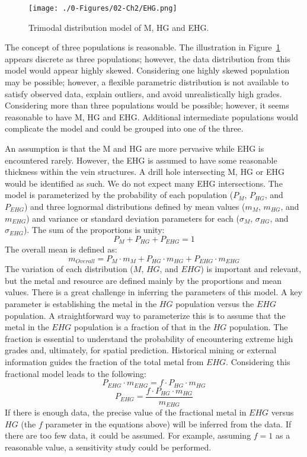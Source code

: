 \begin{figure}[htb!]
    \centering
    \texttt{[image: ./0-Figures/02-Ch2/EHG.png]}
    \caption{Trimodal distribution model of \acrfull{M}, \acrfull{HG} and \acrfull{EHG}.}
    \label{fig:ehg}
\end{figure}


The concept of three populations is reasonable. The illustration in Figure~\ref{fig:ehg} appears discrete as three populations; however, the data distribution from this model would appear highly skewed. Considering one highly skewed population may be possible; however, a flexible parametric distribution is not available to satisfy observed data, explain outliers, and avoid unrealistically high grades. Considering more than three populations would be possible; however, it seems reasonable to have \gls{M}, \gls{HG} and \gls{EHG}. Additional intermediate populations would complicate the model and could be grouped into one of the three.

An assumption is that the \gls{M} and \gls{HG} are more pervasive while \gls{EHG} is encountered rarely. However, the \gls{EHG} is assumed to have some reasonable thickness within the vein structures. A drill hole intersecting \gls{M}, \gls{HG} or \gls{EHG} would be identified as such. We do not expect many \gls{EHG} intersections. The model is parameterized by the probability of each population ($P_{M}$, $P_{HG}$, and $P_{EHG}$) and three lognormal distributions defined by mean values ($m_{M}$, $m_{HG}$, and $m_{EHG}$) and variance or standard deviation parameters for each ($\sigma_{M}$, $\sigma_{HG}$, and $\sigma_{EHG}$). The sum of the proportions is unity:
\[
    P_{M} + P_{HG} + P_{EHG}= 1
\]
The overall mean is defined as:
\[
    m_{Overall} = P_{M} \cdot m_{M}  + P_{HG} \cdot m_{HG} + P_{EHG} \cdot m_{EHG}
\]
The variation of each distribution ($M$, $HG$, and $EHG$) is important and relevant, but the metal and resource are defined mainly by the proportions and mean values. There is a great challenge in inferring the parameters of this model. A key parameter is establishing the metal in the $HG$ population versus the $EHG$ population. A straightforward way to parameterize this is to assume that the metal in the $EHG$ population is a fraction of that in the $HG$ population. The fraction is essential to understand the probability of encountering extreme high grades and, ultimately, for spatial prediction. Historical mining or external information guides the fraction of the total metal from $EHG$. Considering this fractional model leads to the following:
\[
    P_{EHG} \cdot m_{EHG} = f \cdot P_{HG} \cdot m_{HG}
\]
\[
    P_{EHG} = \frac{f \cdot P_{HG} \cdot m_{HG}}{m_{EHG}}
\]
If there is enough data, the precise value of the fractional metal in $EHG$ versus $HG$ (the $f$ parameter in the equations above) will be inferred from the data. If there are too few data, it could be assumed. For example, assuming $f=1$ as a reasonable value, a sensitivity study could be performed.

